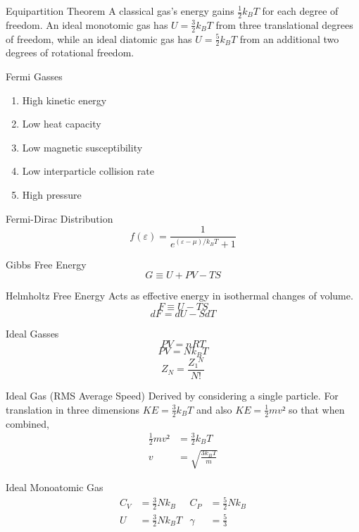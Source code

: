 \documentclass[avery5371]{flashcards}
\begin{document}
\begin{flashcard}{Equipartition Theorem}
	A classical gas's energy gains $\frac 12 k_B T$ for each degree of
	freedom. An ideal monotomic gas has
		$ U = \frac 32 k_B T $
	from three translational degrees of freedom, while an ideal diatomic gas
	has
		$ U = \frac 52 k_B T $
	from an additional two degrees of rotational freedom.
\end{flashcard}

\begin{flashcard}{Fermi Gasses}
	\begin{enumerate}
		\item High kinetic energy
		\item Low heat capacity
		\item Low magnetic susceptibility
		\item Low interparticle collision rate
		\item High pressure
	\end{enumerate}
\end{flashcard}

\begin{flashcard}{Fermi-Dirac Distribution}
	\[ f(ε) = \frac{1}{e^{(ε-μ)/k_B T} + 1} \]
\end{flashcard}

\begin{flashcard}{Gibbs Free Energy}
	\[ G ≡ U + PV - TS \]
\end{flashcard}

\begin{flashcard}{Helmholtz Free Energy}
	Acts as effective energy in isothermal changes of volume.
	\[ F ≡ U - TS \]
	\[ dF = dU - S dT \]
\end{flashcard}

\begin{flashcard}{Ideal Gasses}
	\[ PV = nRT \]
	\[ PV = N k_B T \]
	\[ Z_N = \frac{Z₁^N}{N!} \]	
\end{flashcard}

\begin{flashcard}{Ideal Gas (RMS Average Speed)}
	Derived by considering a single particle. For translation in three
	dimensions $KE = \frac 32 k_B T$  and also $KE = \frac 12 mv²$ so that
	when combined,
	\begin{align*}
		\frac 12 mv² &= \frac 32 k_B T \\
		v &= \sqrt{\frac{3 k_B T}{m}}
	\end{align*}
\end{flashcard}

\begin{flashcard}{Ideal Monoatomic Gas}
	\begin{align*}
		C_V &= \frac 32 Nk_B
			& C_P &= \frac 52 Nk_B \\
		U &= \frac 32 Nk_B T
			& γ &= \frac 53
	\end{align*}
\end{flashcard}
\end{document}
